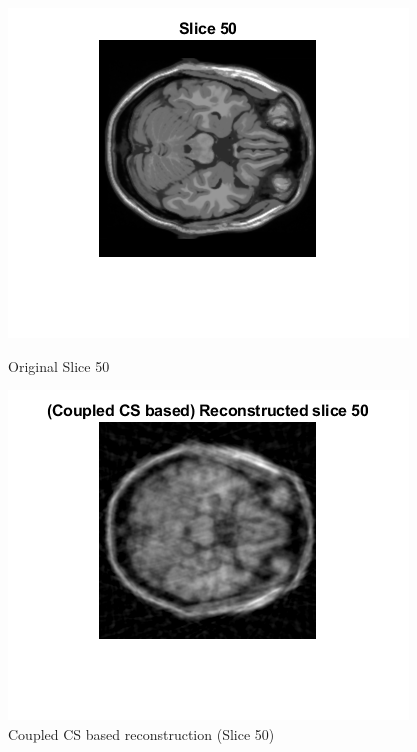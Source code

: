 \documentclass[12pt]{article}
\begin{document}
\begin{enumerate}[label = (\alph*)]
\begin{figure}[H]
        \centering
        \begin{minipage}{.45\textwidth}
            \centering
            \includegraphics[width=\linewidth]{Images/Q3_50.png}
            \caption*{Original Slice 50}
        \end{minipage}
        \begin{minipage}{.45\textwidth}
            \centering
            \includegraphics[width=\linewidth]{Images/Q3_50_c.png}
            \caption*{Coupled CS based reconstruction (Slice 50) }
        \end{minipage}

\end{figure}
\end{enumerate}
\end{document}
